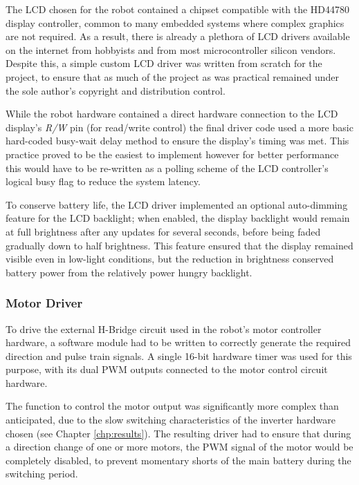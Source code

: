 The LCD chosen for the robot contained a chipset compatible with the HD44780 display controller, common to many embedded systems where complex graphics are not required. As a result, there is already a plethora of LCD drivers available on the internet from hobbyists and from most microcontroller silicon vendors. Despite this, a simple custom LCD driver was written from scratch for the project, to ensure that as much of the project as was practical remained under the sole author's copyright and distribution control.

While the robot hardware contained a direct hardware connection to the LCD display's \textit{R/W} pin (for read/write control) the final driver code used a more basic hard-coded busy-wait delay method to ensure the display's timing was met. This practice proved to be the easiest to implement however for better performance this would have to be re-written as a polling scheme of the LCD controller's logical busy flag to reduce the system latency.

To conserve battery life, the LCD driver implemented an optional auto-dimming feature for the LCD backlight; when enabled, the display backlight would remain at full brightness after any updates for several seconds, before being faded gradually down to half brightness. This feature ensured that the display remained visible even in low-light conditions, but the reduction in brightness conserved battery power from the relatively power hungry backlight.

\FloatBarrier
\subsubsection{Motor Driver}

To drive the external H-Bridge circuit used in the robot's motor controller hardware, a software module had to be written to correctly generate the required direction and pulse train signals. A single 16-bit hardware timer was used for this purpose, with its dual PWM outputs connected to the motor control circuit hardware.

The function to control the motor output was significantly more complex than anticipated, due to the slow switching characteristics of the inverter hardware chosen (see Chapter \ref{chp:results}). The resulting driver had to ensure that during a direction change of one or more motors, the PWM signal of the motor would be completely disabled, to prevent momentary shorts of the main battery during the switching period.

